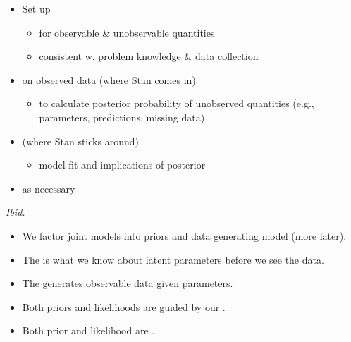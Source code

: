\documentclass[10pt]{report}
\begin{document}
%
\begin{itemize}
\item Set up 
  \vspace*{-4pt}
  \begin{itemize}
  \item for  observable \& unobservable quantities
  \item consistent w. problem knowledge \& data collection
  \end{itemize}
\item {} on observed data (where Stan comes in)
  \vspace*{-4pt}
  \begin{itemize}
  \item to calculate posterior probability of unobserved quantities
    (e.g., parameters, predictions, missing data)
  \end{itemize}
\item {} (where Stan sticks around)
  \vspace*{-4pt}
  \begin{itemize}
  \item model fit and implications of posterior
  \end{itemize}
\vfill
\item {} as necessary
\end{itemize}
\vfill\hfill {\footnotesize {\slshape Ibid.}}


%
\begin{itemize}
\item We factor joint models into priors and data generating model (more later).
\item The  is what we know about latent parameters before we see the data.
\item The  generates observable data given parameters.
\item Both priors and likelihoods are guided by our . 
\item Both prior and likelihood are .
\end{itemize}  
\end{document}
